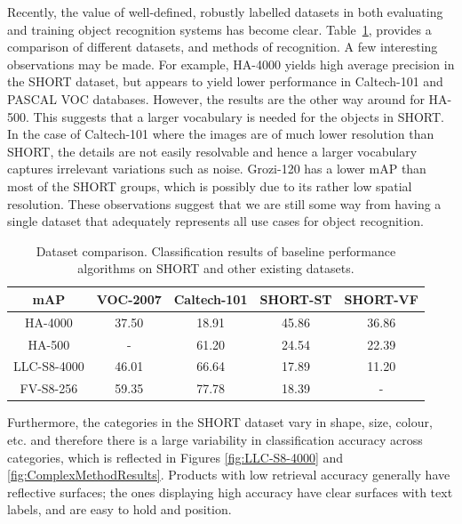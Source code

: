 Recently, the value of well-defined, robustly labelled datasets in both evaluating and training object recognition systems has become clear. Table~\ref{table:dataset_comparison}, provides a comparison of different datasets, and methods of recognition.  A few interesting observations may be made. For example, HA-4000 yields high average precision in the SHORT dataset, but appears to yield lower performance in Caltech-101 and PASCAL VOC databases. However, the results are the other way around for HA-500.  This suggests that a larger vocabulary is needed for the objects in SHORT. In the case of Caltech-101 where the images are of much lower resolution than SHORT, the details are not easily resolvable and hence a larger vocabulary captures irrelevant variations such as noise. Grozi-120 has a lower mAP than most of the SHORT groups, which is possibly due to its rather low spatial resolution. These observations suggest that we are still some way from having a single dataset that adequately represents all use cases for object recognition.


\begin{table}
\begin{center}
    \begin{tabular}{ccccc}
    \toprule
    mAP & VOC-2007 & Caltech-101 & SHORT-ST & SHORT-VF \\
	\midrule
    HA-4000                    & 37.50    & 18.91       & 45.86       & 36.86 \\
    HA-500                     & -        & 61.20       & 24.54       & 22.39       \\
    LLC-S8-4000                & 46.01    & 66.64       & 17.89       & 11.20       \\
    FV-S8-256                  & 59.35    & 77.78       & 18.39       & -           \\
	\bottomrule
    \end{tabular}
	\end{center}
    \caption{Dataset comparison. Classification results of baseline performance algorithms on SHORT and other existing datasets.}
    \label{table:dataset_comparison}
\end{table}


Furthermore, the categories in the SHORT dataset vary in shape, size, colour, etc. and therefore there is a large variability in classification accuracy across categories, which is reflected in Figures \ref{fig:LLC-S8-4000} and \ref{fig:ComplexMethodResults}. Products with low retrieval accuracy generally have reflective surfaces; the ones displaying high accuracy have clear surfaces with text labels, and are easy to hold and position. 



